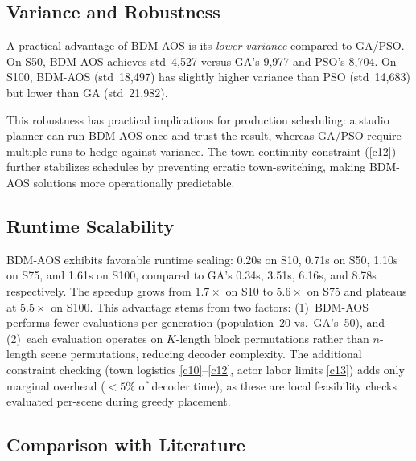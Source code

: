 \subsection{Variance and Robustness}

A practical advantage of BDM-AOS is its \emph{lower variance} compared to GA/PSO.
On S50, BDM-AOS achieves std~4{,}527 versus GA's 9{,}977 and PSO's 8{,}704.
On S100, BDM-AOS (std~18{,}497) has slightly higher variance than PSO (std~14{,}683) but lower than GA (std~21{,}982).

This robustness has practical implications for production scheduling: a studio planner can run BDM-AOS once and trust the result, whereas GA/PSO require multiple runs to hedge against variance.
The town-continuity constraint (\ref{c12}) further stabilizes schedules by preventing erratic town-switching, making BDM-AOS solutions more operationally predictable.

\subsection{Runtime Scalability}

BDM-AOS exhibits favorable runtime scaling: 0.20s on S10, 0.71s on S50, 1.10s on S75, and 1.61s on S100, compared to GA's 0.34s, 3.51s, 6.16s, and 8.78s respectively.
The speedup grows from $1.7\times$ on S10 to $5.6\times$ on S75 and plateaus at $5.5\times$ on S100.
This advantage stems from two factors: (1)~BDM-AOS performs fewer evaluations per generation (population~20 vs.\ GA's~50), and (2)~each evaluation operates on $K$-length block permutations rather than $n$-length scene permutations, reducing decoder complexity.
The additional constraint checking (town logistics \ref{c10}--\ref{c12}, actor labor limits \ref{c13}) adds only marginal overhead ($<5$\% of decoder time), as these are local feasibility checks evaluated per-scene during greedy placement.

\subsection{Comparison with Literature}

